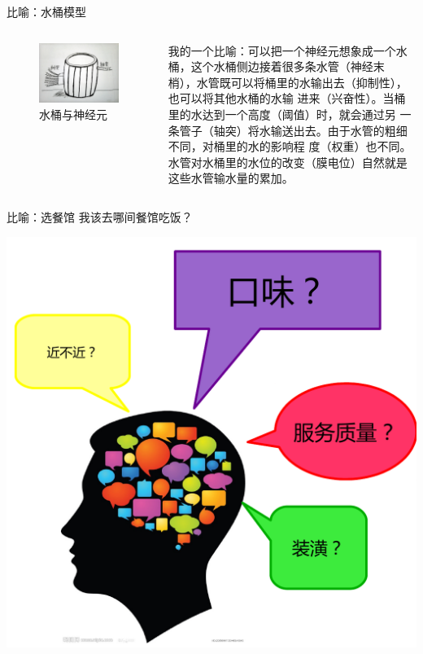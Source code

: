 \documentclass[xcolor=svgnames]{beamer}
\begin{document}
\begin{frame}{比喻：水桶模型}
  
  \begin{columns}
    \begin{figure}
      \centering
      \includegraphics[width=\textwidth]{fig29.jpg}
      \caption{水桶与神经元}
      \label{fig:barrel}
    \end{figure}

    \small

    \setlength\parindent{2em}
    
    我的一个比喻：可以把一个神经元想象成一个水桶，这个水桶侧边接着很多条水管（\alert{神经末
      梢}），水管既可以将桶里的水输出去（\alert{抑制性}），也可以将其他水桶的水输
    进来（\alert{兴奋性}）。当桶里的水达到一个高度（\alert{阈值}）时，就会通过另
    一条管子（\alert{轴突}）将水输送出去。由于水管的粗细不同，对桶里的水的影响程
    度（\alert{权重}）也不同。水管对水桶里的水位的改变（\alert{膜电位}）自然就是
    这些水管输水量的累加。    
    
  \end{columns}
\end{frame}

\begin{frame}{比喻：选餐馆}
  我该去哪间餐馆吃饭？
  
  \begin{center}
    \includegraphics[width=.5\textwidth]{fig30.pdf}
  \end{center}
\end{frame}
\end{document}
